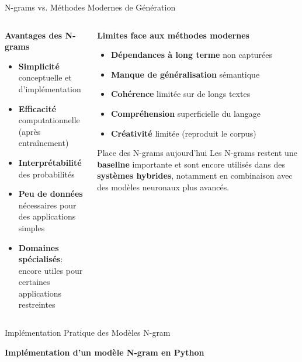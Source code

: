 \documentclass[aspectratio=169,11pt]{beamer}
\begin{document}
\begin{frame}{N-grams vs. Méthodes Modernes de Génération}
    \begin{columns}
        \begin{column}{0.5\textwidth}
            \textbf{Avantages des N-grams}
            \begin{itemize}
                \item \textbf{Simplicité} conceptuelle et d'implémentation
                \item \textbf{Efficacité} computationnelle (après entraînement)
                \item \textbf{Interprétabilité} des probabilités
                \item \textbf{Peu de données} nécessaires pour des applications simples
                \item \textbf{Domaines spécialisés}: encore utiles pour certaines applications restreintes
            \end{itemize}
        \end{column}
        \begin{column}{0.5\textwidth}
            \textbf{Limites face aux méthodes modernes}
            \begin{itemize}
                \item \textbf{Dépendances à long terme} non capturées
                \item \textbf{Manque de généralisation} sémantique
                \item \textbf{Cohérence} limitée sur de longs textes
                \item \textbf{Compréhension} superficielle du langage
                \item \textbf{Créativité} limitée (reproduit le corpus)
            \end{itemize}
            \vspace{0.3cm}
            \begin{alertblock}{Place des N-grams aujourd'hui}
                Les N-grams restent une \textbf{baseline} importante et sont encore utilisés dans des \textbf{systèmes hybrides}, notamment en combinaison avec des modèles neuronaux plus avancés.
            \end{alertblock}
        \end{column}
    \end{columns}
\end{frame}
\begin{frame}{Implémentation Pratique des Modèles N-gram}
    \begin{center}
        \textbf{Implémentation d'un modèle N-gram en Python}
    \end{center}
\end{frame}
\end{document}
